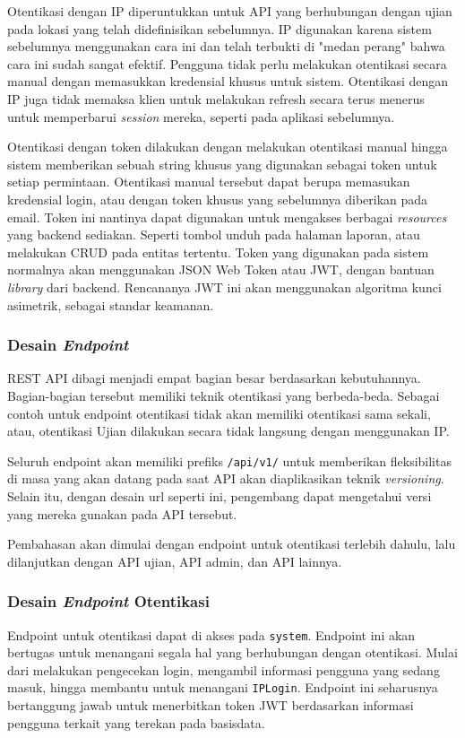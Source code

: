     Otentikasi dengan IP diperuntukkan untuk API yang berhubungan dengan ujian pada lokasi yang telah
    didefinisikan sebelumnya. IP digunakan karena sistem sebelumnya menggunakan cara ini dan telah
    terbukti di "medan perang" bahwa cara ini sudah sangat efektif. Pengguna tidak perlu melakukan
    otentikasi secara manual dengan memasukkan kredensial khusus untuk sistem. Otentikasi dengan IP
    juga tidak memaksa klien untuk melakukan refresh secara terus menerus untuk memperbarui 
    \textit{session} mereka, seperti pada aplikasi sebelumnya.
    
    Otentikasi dengan token dilakukan dengan melakukan otentikasi manual hingga sistem memberikan
    sebuah string khusus yang digunakan sebagai token untuk setiap permintaan. Otentikasi
    manual tersebut dapat berupa memasukan kredensial login, atau dengan token khusus yang sebelumnya
    diberikan pada email. Token ini nantinya dapat digunakan untuk mengakses berbagai 
    \textit{resources} yang backend sediakan. Seperti tombol unduh pada halaman laporan, atau
    melakukan CRUD pada entitas tertentu.
    Token yang digunakan pada sistem normalnya akan menggunakan JSON Web Token atau JWT, dengan bantuan 
    \textit{library} dari backend. Rencananya JWT ini akan menggunakan algoritma kunci asimetrik,
    sebagai standar keamanan.
    
\subsubsection{Desain \textit{Endpoint}}
    REST API dibagi menjadi empat bagian besar berdasarkan kebutuhannya. Bagian-bagian tersebut
    memiliki teknik otentikasi yang berbeda-beda. Sebagai contoh untuk endpoint otentikasi
    tidak akan memiliki otentikasi sama sekali, atau, otentikasi Ujian dilakukan secara tidak
    langsung dengan menggunakan IP. 
    
    Seluruh endpoint akan memiliki prefiks \texttt{/api/v1/} untuk memberikan fleksibilitas di masa
    yang akan datang pada saat API akan diaplikasikan teknik \textit{versioning}. Selain itu,
    dengan desain url seperti ini, pengembang dapat mengetahui versi yang mereka gunakan pada
    API tersebut.
    
    Pembahasan akan dimulai dengan endpoint untuk otentikasi
    terlebih dahulu, lalu dilanjutkan dengan API ujian, API admin, dan API lainnya.
    
\subsubsection{Desain \textit{Endpoint} Otentikasi}
    Endpoint untuk otentikasi dapat di akses pada \texttt{system}. Endpoint ini akan bertugas untuk
    menangani segala hal yang berhubungan dengan otentikasi. Mulai dari melakukan pengecekan
    login, mengambil informasi pengguna yang sedang masuk, hingga membantu untuk menangani \texttt{IPLogin}. 
    Endpoint ini seharusnya bertanggung jawab untuk menerbitkan token JWT
    berdasarkan informasi pengguna terkait yang terekan pada basisdata.
    
